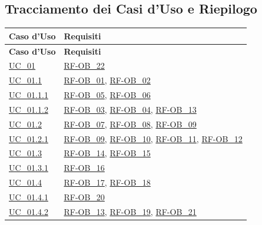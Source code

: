 \subsection{Tracciamento dei Casi d'Uso e Riepilogo}

\renewcommand{\arraystretch}{1.2}
\begin{longtable}{|
        >{\raggedright\arraybackslash}p{} |
        >{\raggedright\arraybackslash}p{} |
    }
    \hline
    \rowcolor[gray]{0.9}
    \textbf{Caso d'Uso} & \textbf{Requisiti} \\
    \hline
    \endfirsthead

    \hline
    \rowcolor[gray]{0.9}
    \textbf{Caso d'Uso} & \textbf{Requisiti} \\
    \hline
    \endhead

    \hyperref[uc_01]{UC\_01} & \hyperlink{rf-ob_22}{RF-OB\_22} \\
    \hline
    \hyperref[uc_01.1]{UC\_01.1} & \hyperlink{rf-ob_1}{RF-OB\_01}, \hyperlink{rf-ob_2}{RF-OB\_02} \\
    \hline
    \hyperref[uc_01.1.1]{UC\_01.1.1} & \hyperlink{rf-ob_5}{RF-OB\_05}, \hyperlink{rf-ob_6}{RF-OB\_06} \\
    \hline
    \hyperref[uc_01.1.2]{UC\_01.1.2} & \hyperlink{rf-ob_3}{RF-OB\_03}, \hyperlink{rf-ob_4}{RF-OB\_04}, \hyperlink{rf-ob_13}{RF-OB\_13} \\
    \hline
    \hyperref[uc_01.2]{UC\_01.2} & \hyperlink{rf-ob_7}{RF-OB\_07}, \hyperlink{rf-ob_8}{RF-OB\_08}, \hyperlink{rf-ob_9}{RF-OB\_09} \\
    \hline
    \hyperref[uc_01.2.1]{UC\_01.2.1} & \hyperlink{rf-ob_9}{RF-OB\_09}, \hyperlink{rf-ob_10}{RF-OB\_10}, \hyperlink{rf-ob_11}{RF-OB\_11}, \hyperlink{rf-ob_12}{RF-OB\_12} \\
    \hline
    \hyperref[uc_01.3]{UC\_01.3} & \hyperlink{rf-ob_14}{RF-OB\_14}, \hyperlink{rf-ob_15}{RF-OB\_15} \\
    \hline
    \hyperref[uc_01.3.1]{UC\_01.3.1} & \hyperlink{rf-ob_16}{RF-OB\_16} \\
    \hline
    \hyperref[uc_01.4]{UC\_01.4} & \hyperlink{rf-ob_17}{RF-OB\_17}, \hyperlink{rf-ob_18}{RF-OB\_18} \\
    \hline
    \hyperref[uc_01.4.1]{UC\_01.4.1} & \hyperlink{rf-ob_20}{RF-OB\_20} \\
    \hline
    \hyperref[uc_01.4.2]{UC\_01.4.2} & \hyperlink{rf-ob_13}{RF-OB\_13}, \hyperlink{rf-ob_19}{RF-OB\_19}, \hyperlink{rf-ob_21}{RF-OB\_21} \\
    \hline


\end{longtable}
